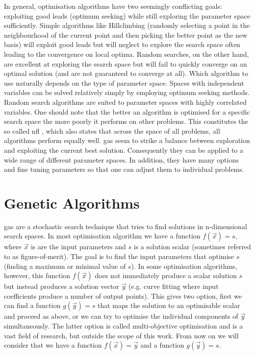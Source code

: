 In general, optimisation algorithms have two seemingly conflicting goals: exploiting good leads (optimum seeking) while still exploring the parameter space sufficiently. Simple algorithms like Hillclimbing (randomly selecting a point in the neighbourhood of the current point and then picking the better point as the new basis) will exploit good leads but will neglect to explore the search space often leading to the convergence on local optima. Random searches, on the other hand, are excellent at exploring the search space but will fail to quickly converge on an optimal solution (and are not guaranteed to converge at all). Which algorithm to use naturally depends on the type of parameter space. Spaces with independent variables can be solved relatively simply by employing optimum seeking methods. Random search algorithms are suited to parameter spaces with highly correlated variables. One should note that the better an algorithm is optimised for a specific search space the more poorly it performs on other problems. This constitutes the so called  \gls{nfl} , which also states that across the space of all problems, all algorithms perform equally well. \glspl{ga} seem to strike a balance between exploration and exploiting the current best solution. Consequently they can be applied to a wide range of different parameter spaces. In addition, they have many options and fine tuning parameters so that one can adjust them to individual problems. 

\section{Genetic Algorithms}
\glspl{ga} are a stochastic search technique that tries to find solutions in n-dimensional search spaces. In most optimisation algorithm we have a function $f(\vec{x})=s$, where $\vec{x}$ is are the input parameters and $s$ is a solution scalar (sometimes referred to as figure-of-merit). The goal is to find the input parameters that optimise $s$ (finding a maximum or minimal value of $s$). In some optimisation algorithms, however,  this function $f(\vec{x})$ does not immediately produce a scalar solution $s$ but instead produces a solution vector $\vec{y}$ (e.g. curve fitting where input coefficients produce a number of output points). This gives two option, first we can find a function $g(\vec{y})=s$ that maps the solution to an optimisable scalar and proceed as above, or we can try to optimise the individual components of $\vec{y}$ simultaneously. The latter option is called multi-objective optimisation and is a vast field of research, but outside the scope of this work. From now on we will consider that we have a function $f(\vec{x})=\vec{y}$ and a function $g(\vec{y})=s$. 

